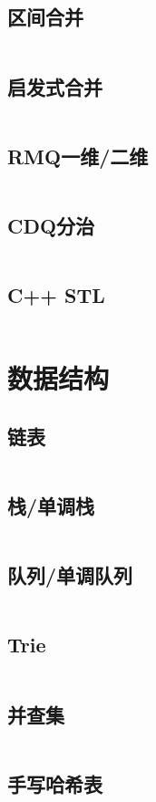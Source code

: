 \documentclass[a4paper,10pt]{article}
\begin{document}
\subsection{区间合并}
\inputminted[breaklines, linenos]{c++}{basic/interval_union.cc}
\subsection{启发式合并}
\inputminted[breaklines, linenos]{c++}{basic/heuristic_merge.cc}
\subsection{RMQ一维/二维}
\inputminted[breaklines, linenos]{c++}{basic/rmq.cc}
\subsection{CDQ分治}
\inputminted[breaklines, linenos]{c++}{basic/cdq.cc}
\subsection{C++ STL}
\inputminted[breaklines, linenos]{md}{basic/stl.cc}

\newpage
\section{数据结构}
\subsection{链表}
\inputminted[breaklines, linenos]{c++}{ds/list.cc}
\subsection{栈/单调栈}
\inputminted[breaklines, linenos]{c++}{ds/stack.cc}
\subsection{队列/单调队列}
\inputminted[breaklines, linenos]{c++}{ds/queue.cc}
\subsection{Trie}
\inputminted[breaklines, linenos]{c++}{ds/trie.cc}
\subsection{并查集}
\inputminted[breaklines, linenos]{c++}{ds/dsu.cc}
\subsection{手写哈希表}
\inputminted[breaklines, linenos]{c++}{ds/hash.cc}
\end{document}
